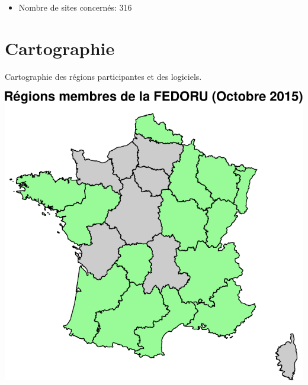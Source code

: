 \documentclass[]{article}
\begin{document}
\begin{itemize}
\itemsep1pt\parskip0pt
\item
  Nombre de sites concernés: 316
\end{itemize}

\section{Cartographie}\label{cartographie}

Cartographie des régions participantes et des logiciels.

\includegraphics{septembre2015_files/figure-latex/carto_region-1.pdf}
\end{document}
